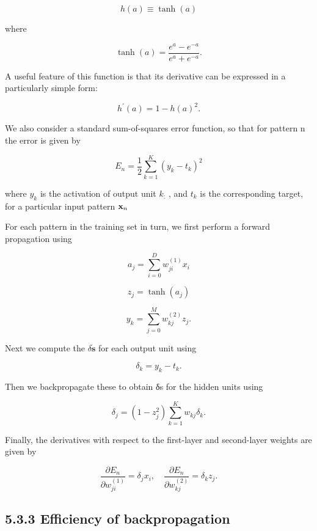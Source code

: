\documentclass[
  10
]{article}
\begin{document}
\[
h (a) \equiv \tanh (a)\tag{5.58}
\]

where

\[
\tanh (a) = \frac {e ^ {a} - e ^ {- a}}{e ^ {a} + e ^ {- a}}.\tag{5.59}
\]

A useful feature of this function is that its derivative can be
expressed in a particularly simple form:

\[
h ^ {\prime} (a) = 1 - h (a) ^ {2}.\tag{5.60}
\]

We also consider a standard sum-of-squares error function, so that for
pattern n the error is given by

\[
E _ {n} = \frac {1}{2} \sum_ {k = 1} ^ {K} (y _ {k} - t _ {k}) ^ {2}\tag{5.61}
\]

where \(y _ { k }\) is the activation of output unit \(k _ { : }\) , and
\(t _ { k }\) is the corresponding target, for a particular input
pattern \({ \bf x } _ { n }\)

For each pattern in the training set in turn, we first perform a forward
propagation using

\[
a _ {j} = \sum_ {i = 0} ^ {D} w _ {j i} ^ {(1)} x _ {i}\tag{5.62}
\]

\[
z _ {j} = \tanh (a _ {j})\tag{5.63}
\]

\[
y _ {k} = \sum_ {j = 0} ^ {M} w _ {k j} ^ {(2)} z _ {j}.\tag{5.64}
\]

Next we compute the \(\delta \mathbf { \dot { s } }\) for each output
unit using

\[
\delta_ {k} = y _ {k} - t _ {k}.\tag{5.65}
\]

Then we backpropagate these to obtain δs for the hidden units using

\[
\delta_ {j} = (1 - z _ {j} ^ {2}) \sum_ {k = 1} ^ {K} w _ {k j} \delta_ {k}.\tag{5.66}
\]

Finally, the derivatives with respect to the first-layer and
second-layer weights are given by

\[
\frac {\partial E _ {n}}{\partial w _ {j i} ^ {(1)}} = \delta_ {j} x _ {i}, \quad \frac {\partial E _ {n}}{\partial w _ {k j} ^ {(2)}} = \delta_ {k} z _ {j}.\tag{5.67}
\]

\subsection{5.3.3 Efficiency of
backpropagation}\label{efficiency-of-backpropagation}
\end{document}
